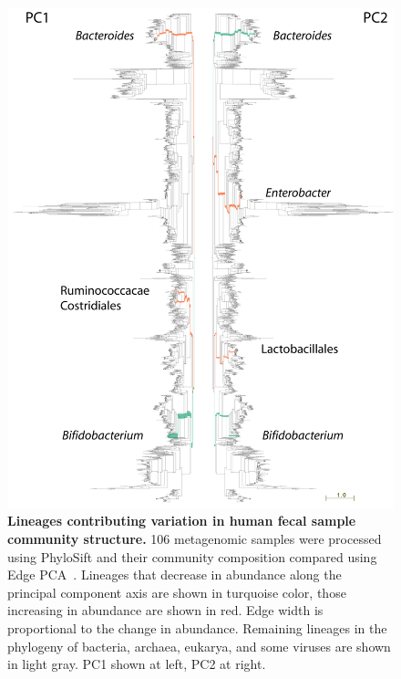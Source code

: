 \documentclass[10pt]{article}
\begin{document}
\begin{figure}[hp]
\begin{center}
\includegraphics[width=6in]{figures/both_prettylike_b2b.png}
\end{center}
\caption{\textbf{Lineages contributing variation in human fecal sample community structure.} 106 metagenomic samples were processed using PhyloSift and their community composition compared using Edge PCA~\cite{Matsen2012}. Lineages that decrease in abundance along the principal component axis are shown in turquoise color, those increasing in abundance are shown in red. Edge width is proportional to the change in abundance. Remaining lineages in the phylogeny of bacteria, archaea, eukarya, and some viruses are shown in light gray. PC1 shown at left, PC2 at right.}
\label{fig:pcaphylo}
\end{figure}
\end{document}
